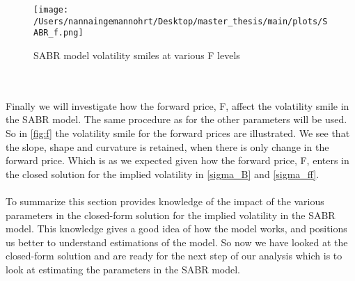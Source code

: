 \begin{figure}[H]
    \centering
    \texttt{[image: /Users/nannaingemannohrt/Desktop/master\_thesis/main/plots/SABR\_f.png]}
    \caption{SABR model volatility smiles at various F levels}
    \label{fig:f}
\end{figure}
\noindent
\\\\
Finally we will investigate how the forward price, F, affect the volatility smile in the SABR model. 
The same procedure as for the other parameters will be used. So in \autoref{fig:f} the volatility smile
for the forward prices are illustrated. We see that the slope, shape and curvature is retained, when there
is only change in the forward price. Which is as we expected given how the forward price, F, enters in the closed
solution for the implied volatility in \autoref{sigma_B} and \autoref{sigma_ff}.
\\\\
To summarize this section provides knowledge of the impact of the various parameters in the closed-form solution
for the implied volatility in the SABR model. This knowledge gives a good idea of how the model works, and 
positions us better to understand estimations of the model. So now we have looked at the closed-form solution and 
are ready for the next step of our analysis which is to look at  estimating the parameters in the SABR model.
\newpage
